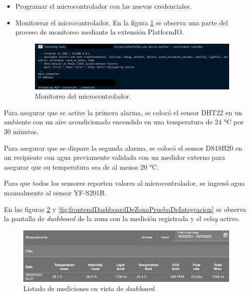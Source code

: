\begin{itemize}
	\item Programar el microcontrolador con las nuevas credenciales.

	\item Monitorear el microcontrolador. En la figura \ref{fig:microcontroladorMonitoreo} se observa una parte del proceso de monitoreo mediante la extensión PlatformIO.
	
\begin{figure}[H]
	\centering
	\includegraphics[width=.9\textwidth]{./Figures/Microcontrolador monitoreo.png}
	\caption{Monitoreo del microcontrolador.}
	\label{fig:microcontroladorMonitoreo}
\end{figure}
\end{itemize}

Para asegurar que se active la primera alarma, se colocó el sensor DHT22 en un ambiente con un aire acondicionado \citep{WEBSITE:BGHR410A} encendido en una temperatura de 24 °C por 30 minutos. 

Para asegurar que se dispare la segunda alarma, se colocó el sensor DS18B20 en un recipiente con agua previamente validada con un medidor externo \citep{WEBSITE:TP101} para asegurar que su temperatura sea de al menos 20 °C. 

Para que todos los sensores reporten valores al microcontrolador, se ingresó agua manualmente al sensor YF-S201B.

En las figuras \ref{fig:frontendListadoMedicionesPruebaDeIntegracion} y \ref{fig:frontendDashboardDeZonaPruebaDeIntegracion} se observa la pantalla de \textit{dashboard} de la zona con la medición registrada y el \textit{relay} activo. 

\begin{figure}[H]
	\centering
	\includegraphics[width=.9\textwidth]{./Figures/Frontend listado de mediciones prueba de integracion.png}
	\caption{Listado de mediciones en vista de \textit{dashboard}.}
	\label{fig:frontendListadoMedicionesPruebaDeIntegracion}
\end{figure}

